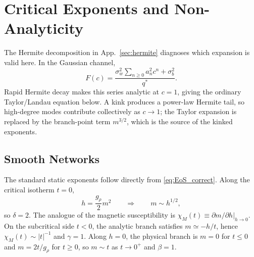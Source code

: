 \documentclass{article}
\theoremstyle{plain}
\theoremstyle{definition}
\theoremstyle{remark}
\begin{document}
\FloatBarrier










\section{Critical Exponents and Non-Analyticity}
\label{ap:exponent_derivations}

The Hermite decomposition in App.~\ref{sec:hermite} diagnoses which expansion is valid here. In the Gaussian channel,
\relax
\begin{equation}
F(c)=\frac{\sigma_w^2\sum_{n\ge0}a_n^2 c^n+\sigma_b^2}{q^*}.
\end{equation}
\relax
Rapid Hermite decay makes this series analytic at \(c=1\), giving the ordinary Taylor/Landau equation below. A kink produces a power-law Hermite tail, so high-degree modes contribute collectively as \(c\to1\); the Taylor expansion is replaced by the branch-point term \(m^{3/2}\), which is the source of the kinked exponents.










\subsection{Smooth Networks}

The standard static exponents follow directly from \eqref{eq:EoS_correct}. Along the critical isotherm \(t=0\),
\relax
\begin{equation}
h=\frac{g_\rho}{2}m^2 \qquad\Rightarrow\qquad m\sim h^{1/2},
\end{equation}
\relax
so \(\delta=2\). The analogue of the magnetic susceptibility is \(\chi_M(t)\equiv \left.\partial m/\partial h\right|_{h\to 0}\).
On the subcritical side \(t<0\), the analytic branch satisfies \(m\simeq -h/t\), hence \(\chi_M(t)\sim |t|^{-1}\) and \(\gamma=1\).
Along \(h=0\), the physical branch is \(m=0\) for \(t\le 0\) and \(m=2t/g_\rho\) for \(t\ge 0\), so \(m\sim t\) as \(t\to 0^+\) and \(\beta=1\).
\end{document}
